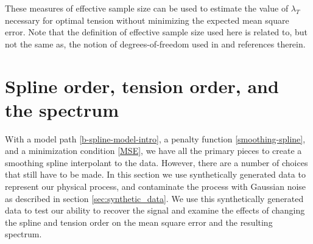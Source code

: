 \documentclass{ametsoc}
\begin{document}
These measures of effective sample size can be used to estimate the value of $\lambda_T$ necessary for optimal tension without minimizing the expected mean square error. Note that the definition of effective sample size used here is related to, but not the same as, the notion of degrees-of-freedom used in \citet{cantoni2002-biom} and references therein.



%
\section{Spline order, tension order, and the spectrum} \label{sec:spline_order_tension_order_spectrum}
%

With a model path \eqref{b-spline-model-intro}, a penalty function \eqref{smoothing-spline}, and a minimization condition \eqref{MSE}, we have all the primary pieces to create a smoothing spline interpolant to the data. However, there are a number of choices that still have to be made. In this section we use synthetically generated data to represent our physical process, and contaminate the process with Gaussian noise as described in section \ref{sec:synthetic_data}. We use this synthetically generated data to test our ability to recover the signal and examine the effects of changing the spline and tension order on the mean square error and the resulting spectrum.
\end{document}
